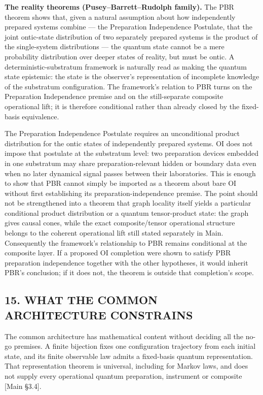 \documentclass[
]{article}
\begin{document}
\textbf{The reality theorems (Pusey--Barrett--Rudolph family).} The PBR
theorem shows that, given a natural assumption about how independently
prepared systems combine --- the Preparation Independence Postulate,
that the joint ontic-state distribution of two separately prepared
systems is the product of the single-system distributions --- the
quantum state cannot be a mere probability distribution over deeper
states of reality, but must be ontic. A deterministic-substratum
framework is naturally read as making the quantum state epistemic: the
state is the observer's representation of incomplete knowledge of the
substratum configuration. The framework's relation to PBR turns on the
Preparation Independence premise and on the still-separate composite
operational lift; it is therefore conditional rather than already closed
by the fixed-basis equivalence.

The Preparation Independence Postulate requires an unconditional product
distribution for the ontic states of independently prepared systems. OI
does not impose that postulate at the substratum level: two preparation
devices embedded in one substratum may share preparation-relevant hidden
or boundary data even when no later dynamical signal passes between
their laboratories. This is enough to show that PBR cannot simply be
imported as a theorem about bare OI without first establishing its
preparation-independence premise. The point should not be strengthened
into a theorem that graph locality itself yields a particular
conditional product distribution or a quantum tensor-product state: the
graph gives causal cones, while the exact composite/tensor operational
structure belongs to the coherent operational lift still stated
separately in Main. Consequently the framework's relationship to PBR
remains conditional at the composite layer. If a proposed OI completion
were shown to satisfy PBR preparation independence together with the
other hypotheses, it would inherit PBR's conclusion; if it does not, the
theorem is outside that completion's scope.

\hypertarget{what-the-common-architecture-constrains}{%
\subsection{15. WHAT THE COMMON ARCHITECTURE
CONSTRAINS}\label{what-the-common-architecture-constrains}}

The common architecture has mathematical content without deciding all
the no-go premises. A finite bijection fixes one configuration
trajectory from each initial state, and its finite observable law admits
a fixed-basis quantum representation. That representation theorem is
universal, including for Markov laws, and does not supply every
operational quantum preparation, instrument or composite {[}Main
§3.4{]}.
\end{document}
